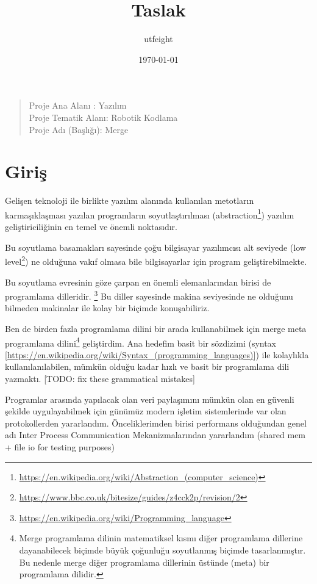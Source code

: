 \documentclass[11pt]{article}
\author{utfeight}
\date{\today}
\title{Taslak}
\begin{document}
\maketitle
\tableofcontents

\begin{verse}
Proje Ana Alanı    : Yazılım\\[0pt]
Proje Tematik Alanı: Robotik Kodlama\\[0pt]
Proje Adı (Başlığı): Merge\\[0pt]
\end{verse}

\begin{center}

\end{center}
\section{Giriş}
\label{sec:org9b2c757}
Gelişen teknoloji ile birlikte yazılım alanında kullanılan metotların karmaşıklaşması yazılan programların soyutlaştırılması
(abstraction\footnote{\url{https://en.wikipedia.org/wiki/Abstraction\_(computer\_science)}}) yazılım geliştiriciliğinin en temel ve önemli noktasıdır.

Bu soyutlama basamakları sayesinde çoğu bilgisayar yazılımcısı alt seviyede (low level\footnote{\url{https://www.bbc.co.uk/bitesize/guides/z4cck2p/revision/2}})
ne olduğuna vakıf olmasa bile bilgisayarlar için program geliştirebilmekte.

Bu soyutlama evresinin göze çarpan en önemli elemanlarından birisi de programlama dilleridir. \footnote{\url{https://en.wikipedia.org/wiki/Programming\_language}}
Bu diller sayesinde makina seviyesinde ne olduğunu bilmeden makinalar ile kolay bir biçimde konuşabiliriz.

Ben de birden fazla programlama dilini bir arada kullanabilmek için merge meta programlama
dilini\footnote{Merge programlama dilinin matematiksel kısmı diğer programlama dillerine dayanabilecek biçimde büyük çoğunluğu soyutlanmış
biçimde tasarlanmıştır. Bu nedenle merge diğer programlama dillerinin üstünde (meta) bir programlama dilidir.} geliştirdim. Ana hedefim basit bir sözdizimi
(syntax [\url{https://en.wikipedia.org/wiki/Syntax\_(programming\_languages)}]) ile kolaylıkla kullanılanılabilen, mümkün olduğu kadar hızlı ve basit bir programlama
dili yazmaktı. [TODO: fix these grammatical mistakes]

Programlar arasında yapılacak olan veri paylaşımını mümkün olan en güvenli şekilde uygulayabilmek için günümüz modern işletim
sistemlerinde var olan protokollerden yararlandım. Önceliklerimden birisi performans olduğundan genel adı Inter Process Communication
Mekanizmalarından yararlandım (shared mem  + file io for testing purposes)
\end{document}
